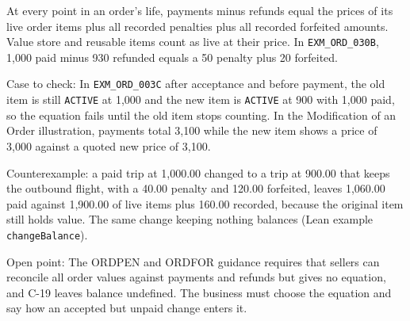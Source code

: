 \begin{theorem}
  \label{thm:change-cancellation-order-balance}
  At every point in an order's life, payments minus refunds equal the prices
  of its live order items plus all recorded penalties plus all recorded
  forfeited amounts. Value store and reusable items count as live at their
  price. In \texttt{EXM\_ORD\_030B}, 1,000 paid minus 930 refunded equals a
  50 penalty plus 20 forfeited.

  Case to check: In \texttt{EXM\_ORD\_003C} after acceptance and before
  payment, the old item is still \texttt{ACTIVE} at 1,000 and the new item
  is \texttt{ACTIVE} at 900 with 1,000 paid, so the equation fails until the
  old item stops counting. In the Modification of an Order illustration,
  payments total 3,100 while the new item shows a price of 3,000 against a
  quoted new price of 3,100.

  Counterexample: a paid trip at 1,000.00 changed to a trip at 900.00 that
  keeps the outbound flight, with a 40.00 penalty and 120.00 forfeited, leaves
  1,060.00 paid against 1,900.00 of live items plus 160.00 recorded, because
  the original item still holds value.  The same change keeping nothing
  balances (Lean example \texttt{changeBalance}).

  Open point: The ORDPEN and ORDFOR guidance requires that sellers can
  reconcile all order values against payments and refunds but gives no
  equation, and C-19 leaves balance undefined. The business must choose the
  equation and say how an accepted but unpaid change enters it.


\end{theorem}
